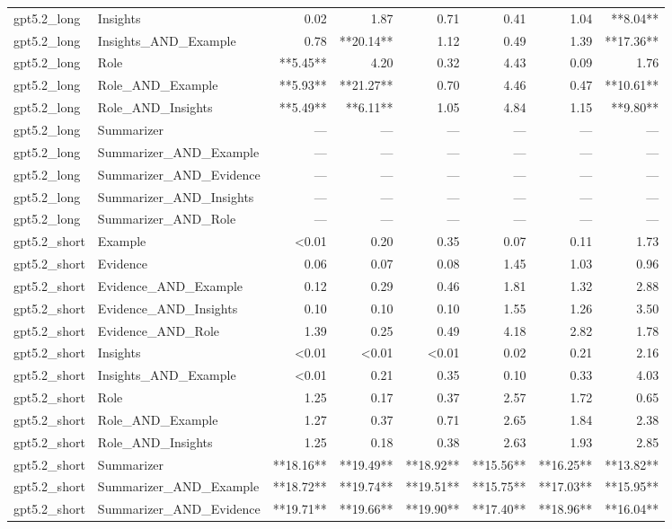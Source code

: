 \begin{tabular}{llrrrrrr}
gpt5.2_long & Insights & 0.02 & 1.87 & 0.71 & 0.41 & 1.04 & **8.04** \\
gpt5.2_long & Insights_AND_Example & 0.78 & **20.14** & 1.12 & 0.49 & 1.39 & **17.36** \\
gpt5.2_long & Role & **5.45** & 4.20 & 0.32 & 4.43 & 0.09 & 1.76 \\
gpt5.2_long & Role_AND_Example & **5.93** & **21.27** & 0.70 & 4.46 & 0.47 & **10.61** \\
gpt5.2_long & Role_AND_Insights & **5.49** & **6.11** & 1.05 & 4.84 & 1.15 & **9.80** \\
gpt5.2_long & Summarizer & — & — & — & — & — & — \\
gpt5.2_long & Summarizer_AND_Example & — & — & — & — & — & — \\
gpt5.2_long & Summarizer_AND_Evidence & — & — & — & — & — & — \\
gpt5.2_long & Summarizer_AND_Insights & — & — & — & — & — & — \\
gpt5.2_long & Summarizer_AND_Role & — & — & — & — & — & — \\
gpt5.2_short & Example & <0.01 & 0.20 & 0.35 & 0.07 & 0.11 & 1.73 \\
gpt5.2_short & Evidence & 0.06 & 0.07 & 0.08 & 1.45 & 1.03 & 0.96 \\
gpt5.2_short & Evidence_AND_Example & 0.12 & 0.29 & 0.46 & 1.81 & 1.32 & 2.88 \\
gpt5.2_short & Evidence_AND_Insights & 0.10 & 0.10 & 0.10 & 1.55 & 1.26 & 3.50 \\
gpt5.2_short & Evidence_AND_Role & 1.39 & 0.25 & 0.49 & 4.18 & 2.82 & 1.78 \\
gpt5.2_short & Insights & <0.01 & <0.01 & <0.01 & 0.02 & 0.21 & 2.16 \\
gpt5.2_short & Insights_AND_Example & <0.01 & 0.21 & 0.35 & 0.10 & 0.33 & 4.03 \\
gpt5.2_short & Role & 1.25 & 0.17 & 0.37 & 2.57 & 1.72 & 0.65 \\
gpt5.2_short & Role_AND_Example & 1.27 & 0.37 & 0.71 & 2.65 & 1.84 & 2.38 \\
gpt5.2_short & Role_AND_Insights & 1.25 & 0.18 & 0.38 & 2.63 & 1.93 & 2.85 \\
gpt5.2_short & Summarizer & **18.16** & **19.49** & **18.92** & **15.56** & **16.25** & **13.82** \\
gpt5.2_short & Summarizer_AND_Example & **18.72** & **19.74** & **19.51** & **15.75** & **17.03** & **15.95** \\
gpt5.2_short & Summarizer_AND_Evidence & **19.71** & **19.66** & **19.90** & **17.40** & **18.96** & **16.04** \\

\end{tabular}
